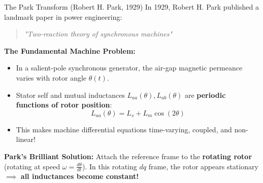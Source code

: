 \begin{frame}[allowframebreaks]{The Park Transform (Robert H. Park, 1929)}
    In 1929, Robert H. Park published a landmark paper in power engineering:
    \begin{quote}
        \textit{"Two-reaction theory of synchronous machines"}
    \end{quote}

    \textbf{The Fundamental Machine Problem:}
    \begin{itemize}
        \item In a salient-pole synchronous generator, the air-gap magnetic permeance varies with rotor angle $\theta(t)$.
        \item Stator self and mutual inductances $L_{aa}(\theta), L_{ab}(\theta)$ are \textbf{periodic functions of rotor position}:
        \begin{equation}
            L_{aa}(\theta) = L_s + L_m \cos(2\theta)
        \end{equation}
        \item This makes machine differential equations time-varying, coupled, and non-linear!
    \end{itemize}

    \textbf{Park's Brilliant Solution:}
    Attach the reference frame to the \textbf{rotating rotor} (rotating at speed $\omega = \frac{d\theta}{dt}$).
    In this rotating $dq$ frame, the rotor appears stationary $\implies$ \alert{\textbf{all inductances become constant!}}
\end{frame}

